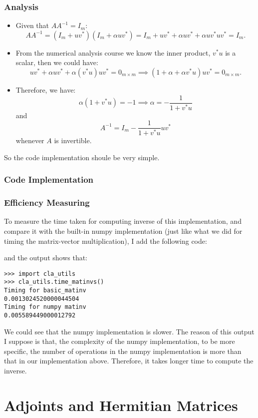 \subsubsection*{Analysis}
\begin{itemize}
  \item Given that $A A^{-1} = I_m$:
    \[
      A A^{-1} = (I_m + u v^{*})(I_m + \alpha u v^{*}) = I_m + uv^{*} + \alpha uv^{*} + \alpha u v^{*}uv^{*} = I_m
    .\]
  \item From the numerical analysis course we know the inner product, $v^{*}u$ is a scalar, then we could have:
    \[
      uv^{*} + \alpha uv^{*} + \alpha (v^{*}u)uv^{*} = 0_{m \times m} \implies (1 + \alpha + \alpha v^{*}u)uv^{*} = 0_{m \times m}
    .\]
  \item Therefore, we have:
    \[
    \alpha (1 + v^{*}u) = -1 \implies \alpha = -\frac{1}{1 + v^{*}u}
    \]
    and
    \[
    A^{-1} = I_m -\frac{1}{1 + v^{*}u} uv^{*}
    \]
    whenever $A$ is invertible.
\end{itemize}
So the code implementation shoule be very simple.
\subsubsection*{Code Implementation}

\subsubsection*{Efficiency Measuring}
To measure the time taken for computing inverse of this implementation, and compare it with the built-in numpy implementation (just like what we did for timing the matrix-vector multiplication), I add the following code:

and the output shows that:
\begin{lstlisting}
>>> import cla_utils
>>> cla_utils.time_matinvs()
Timing for basic_matinv
0.0013024520000044504
Timing for numpy matinv
0.005589449000012792
\end{lstlisting}

\noindent We could see that the numpy implementation is slower. The reason of this output I suppose is that, the complexity of the numpy implementation, to be more specific, the number of operations in the numpy implementation is more than that in our implementation above. Therefore, it takes longer time to compute the inverse.

\section{Adjoints and Hermitian Matrices}%

